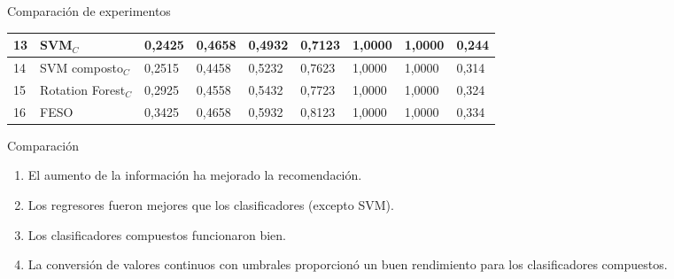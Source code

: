 \begin{frame}
\begin{block}{Comparación de experimentos}
\begin{table}[!htp]
\begin{tabular}{|l|l|l|l|l|l|l|l|l|}
\rowcolor{amarelo}	13 & SVM\(_C\)    			& 0,2425 & 0,4658 & 0,4932 & 0,7123 & 1,0000 & 1,0000 & 0,244 \\ \hline
\rowcolor{azul}		14 & SVM composto\(_C\)		& 0,2515 & 0,4458 & 0,5232 & 0,7623 & 1,0000 & 1,0000 & 0,314 \\ \hline
\rowcolor{azul}		15 & Rotation Forest\(_C\)  & 0,2925 & 0,4558 & 0,5432 & 0,7723 & 1,0000 & 1,0000 & 0,324 \\ \hline
\rowcolor{vermelho}	16 & FESO          			& 0,3425 & 0,4658 & 0,5932 & 0,8123 & 1,0000 & 1,0000 & 0,334 \\ \hline
			\end{tabular}
		\end{table}
		\egroup
		
	\end{block}
\end{frame}


\begin{frame}
	\begin{block}{Comparación}
		\begin{enumerate}
			\item El aumento de la información ha mejorado la recomendación.
			\item Los regresores fueron mejores que los clasificadores (excepto SVM).
			\item Los clasificadores compuestos funcionaron bien.
			\item La conversión de valores continuos con umbrales proporcionó un buen rendimiento para los clasificadores compuestos.
		\end{enumerate}
		
	\end{block}
\end{frame}

